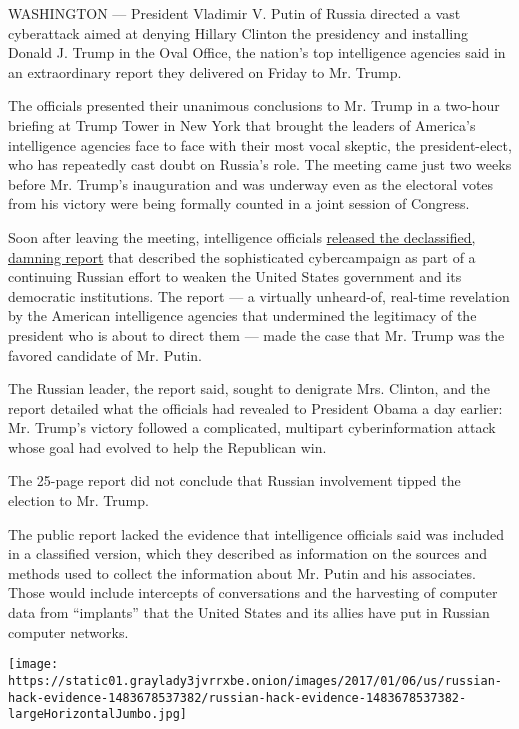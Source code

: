 WASHINGTON --- President Vladimir V. Putin of Russia directed a vast
cyberattack aimed at denying Hillary Clinton the presidency and
installing Donald J. Trump in the Oval Office, the nation's top
intelligence agencies said in an extraordinary report they delivered on
Friday to Mr. Trump.

The officials presented their unanimous conclusions to Mr. Trump in a
two-hour briefing at Trump Tower in New York that brought the leaders of
America's intelligence agencies face to face with their most vocal
skeptic, the president-elect, who has repeatedly cast doubt on Russia's
role. The meeting came just two weeks before Mr. Trump's inauguration
and was underway even as the electoral votes from his victory were being
formally counted in a joint session of Congress.

Soon after leaving the meeting, intelligence officials
\href{http://www.nytimes3xbfgragh.onion/interactive/2017/01/06/us/politics/document-russia-hacking-report-intelligence-agencies.html?_r=0}{released
the declassified, damning report} that described the sophisticated
cybercampaign as part of a continuing Russian effort to weaken the
United States government and its democratic institutions. The report ---
a virtually unheard-of, real-time revelation by the American
intelligence agencies that undermined the legitimacy of the president
who is about to direct them --- made the case that Mr. Trump was the
favored candidate of Mr. Putin.

The Russian leader, the report said, sought to denigrate Mrs. Clinton,
and the report detailed what the officials had revealed to President
Obama a day earlier: Mr. Trump's victory followed a complicated,
multipart cyberinformation attack whose goal had evolved to help the
Republican win.

The 25-page report did not conclude that Russian involvement tipped the
election to Mr. Trump.

The public report lacked the evidence that intelligence officials said
was included in a classified version, which they described as
information on the sources and methods used to collect the information
about Mr. Putin and his associates. Those would include intercepts of
conversations and the harvesting of computer data from ``implants'' that
the United States and its allies have put in Russian computer networks.

\href{https://www.nytimes3xbfgragh.onion/interactive/2017/01/06/us/russian-hack-evidence.html}{}

\texttt{[image: https://static01.graylady3jvrrxbe.onion/images/2017/01/06/us/russian-hack-evidence-1483678537382/russian-hack-evidence-1483678537382-largeHorizontalJumbo.jpg]}

